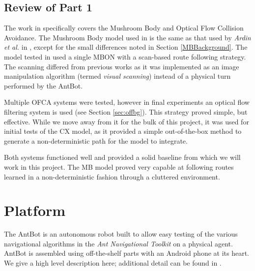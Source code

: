 \documentclass[a4paper,11pt,twoside,openright]{article}
\let\oldsection\section
\def\section{\cleardoublepage\oldsection}
\begin{document}
\subsection{ Review of Part 1 }
The work in \cite{Mitchell2018} specifically covers the Mushroom Body
and Optical Flow Collision Avoidance. The Mushroom Body model used in
\cite{Mitchell2018} is the same as that used by \textit{Ardin et al.} in
\cite{Ardin2016}, except for the small differences noted in Section
\ref{MBBackground}. The model tested in \cite{Mitchell2018} used a single MBON
with a scan-based route following strategy. The scanning differed from previous
works as it was implemented as an image manipulation algorithm (termed
\textit{visual scanning}) instead of a physical turn performed by the AntBot.
\newline
\par

Multiple OFCA systems were tested, however in final experiments an
optical flow filtering system is used (see Section
\ref{sec:offbg}). This strategy proved simple, but effective. While we
move away from it for the bulk of this project, it was used for
initial tests of the CX model, as it provided a simple out-of-the-box
method to generate a non-deterministic path for the model to
integrate.
\newline
\par

Both systems functioned well and provided a solid baseline from which we will
work in this project. The MB model proved very capable at following routes
learned in a non-deterministic fashion through a cluttered environment.

\newpage

\section{ Platform } \label{sec:platform}
The AntBot is an autonomous robot built to allow easy testing of the
various navigational algorithms in the \textit{Ant Navigational Toolkit}
on a physical agent. AntBot is assembled using off-the-shelf parts with an
Android phone at its heart. We give a high level description here; additional
detail can be found in \cite{Mitchell2018}.
\end{document}
